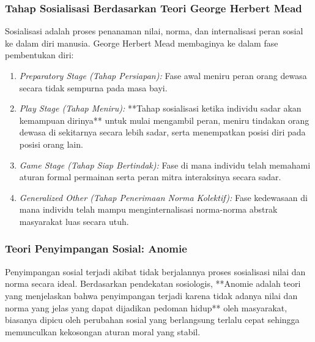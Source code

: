 \documentclass[12pt, a4paper]{article}
\begin{document}
\subsubsection{Tahap Sosialisasi Berdasarkan Teori George Herbert Mead}
Sosialisasi adalah proses penanaman nilai, norma, dan internalisasi peran sosial ke dalam diri manusia. George Herbert Mead membaginya ke dalam fase pembentukan diri:
\begin{enumerate}
    \item \textit{Preparatory Stage (Tahap Persiapan):} Fase awal meniru peran orang dewasa secara tidak sempurna pada masa bayi.
    \item \textit{Play Stage (Tahap Meniru):} **Tahap sosialisasi ketika individu sadar akan kemampuan dirinya** untuk mulai mengambil peran, meniru tindakan orang dewasa di sekitarnya secara lebih sadar, serta menempatkan posisi diri pada posisi orang lain.
    \item \textit{Game Stage (Tahap Siap Bertindak):} Fase di mana individu telah memahami aturan formal permainan serta peran mitra interaksinya secara sadar.
    \item \textit{Generalized Other (Tahap Penerimaan Norma Kolektif):} Fase kedewasaan di mana individu telah mampu menginternalisasi norma-norma abstrak masyarakat luas secara utuh.
\end{enumerate}

\subsubsection{Teori Penyimpangan Sosial: Anomie}
Penyimpangan sosial terjadi akibat tidak berjalannya proses sosialisasi nilai dan norma secara ideal. Berdasarkan pendekatan sosiologis, **Anomie adalah teori yang menjelaskan bahwa penyimpangan terjadi karena tidak adanya nilai dan norma yang jelas yang dapat dijadikan pedoman hidup** oleh masyarakat, biasanya dipicu oleh perubahan sosial yang berlangsung terlalu cepat sehingga memunculkan kekosongan aturan moral yang stabil.
\end{document}
